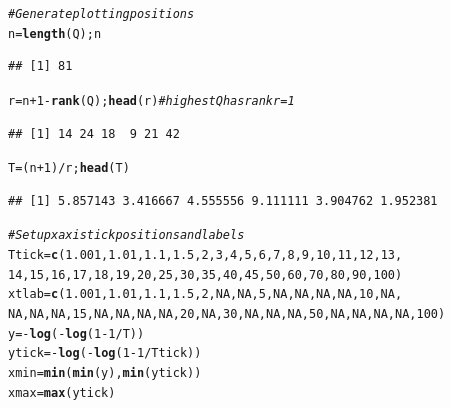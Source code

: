 \documentclass{tufte-handout}\usepackage[]{graphicx}\usepackage[]{xcolor}
\makeatletter
\newcommand{\hlnum}[1]{\textcolor[rgb]{0.686,0.059,0.569}{#1}}%
\newcommand{\hlcom}[1]{\textcolor[rgb]{0.678,0.584,0.686}{\textit{#1}}}%
\newcommand{\hlopt}[1]{\textcolor[rgb]{0,0,0}{#1}}%
\newcommand{\hlstd}[1]{\textcolor[rgb]{0.345,0.345,0.345}{#1}}%
\newcommand{\hlkwb}[1]{\textcolor[rgb]{0.69,0.353,0.396}{#1}}%
\newcommand{\hlkwd}[1]{\textcolor[rgb]{0.737,0.353,0.396}{\textbf{#1}}}%
\newenvironment{kframe}{%
 \def\at@end@of@kframe{}%
 \ifinner\ifhmode%
  \def\at@end@of@kframe{\end{minipage}}%
  \begin{minipage}{\columnwidth}%
 \fi\fi%
 \def\FrameCommand##1{\hskip\@totalleftmargin \hskip-\fboxsep
 \colorbox{shadecolor}{##1}\hskip-\fboxsep
     \hskip-\linewidth \hskip-\@totalleftmargin \hskip\columnwidth}%
 \MakeFramed {\advance\hsize-\width
   \@totalleftmargin\z@ \linewidth\hsize
   \@setminipage}}%
 {\par\unskip\endMakeFramed%
 \at@end@of@kframe}
\newenvironment{knitrout}{}{} %
\makeatother
\begin{document}
\begin{knitrout}
\begin{kframe}
\begin{alltt}
\hlcom{# Generate plotting positions}
\hlstd{n} \hlkwb{=} \hlkwd{length}\hlstd{(Q); n}
\end{alltt}
\begin{verbatim}
## [1] 81
\end{verbatim}
\begin{alltt}
\hlstd{r} \hlkwb{=} \hlstd{n} \hlopt{+} \hlnum{1} \hlopt{-} \hlkwd{rank}\hlstd{(Q);} \hlkwd{head}\hlstd{(r)}  \hlcom{# highest Q has rank r = 1}
\end{alltt}
\begin{verbatim}
## [1] 14 24 18  9 21 42
\end{verbatim}
\begin{alltt}
\hlstd{T} \hlkwb{=} \hlstd{(n} \hlopt{+} \hlnum{1}\hlstd{)}\hlopt{/}\hlstd{r;} \hlkwd{head}\hlstd{(T)}
\end{alltt}
\begin{verbatim}
## [1] 5.857143 3.416667 4.555556 9.111111 3.904762 1.952381
\end{verbatim}
\begin{alltt}
\hlcom{# Set up x axis tick positions and labels}
\hlstd{Ttick} \hlkwb{=} \hlkwd{c}\hlstd{(}\hlnum{1.001}\hlstd{,}\hlnum{1.01}\hlstd{,}\hlnum{1.1}\hlstd{,}\hlnum{1.5}\hlstd{,}\hlnum{2}\hlstd{,}\hlnum{3}\hlstd{,}\hlnum{4}\hlstd{,}\hlnum{5}\hlstd{,}\hlnum{6}\hlstd{,}\hlnum{7}\hlstd{,}\hlnum{8}\hlstd{,}\hlnum{9}\hlstd{,}\hlnum{10}\hlstd{,}\hlnum{11}\hlstd{,}\hlnum{12}\hlstd{,}\hlnum{13}\hlstd{,}
          \hlnum{14}\hlstd{,}\hlnum{15}\hlstd{,}\hlnum{16}\hlstd{,}\hlnum{17}\hlstd{,}\hlnum{18}\hlstd{,}\hlnum{19}\hlstd{,}\hlnum{20}\hlstd{,}\hlnum{25}\hlstd{,}\hlnum{30}\hlstd{,}\hlnum{35}\hlstd{,}\hlnum{40}\hlstd{,}\hlnum{45}\hlstd{,}\hlnum{50}\hlstd{,}\hlnum{60}\hlstd{,}\hlnum{70}\hlstd{,}\hlnum{80}\hlstd{,}\hlnum{90}\hlstd{,}\hlnum{100}\hlstd{)}
\hlstd{xtlab} \hlkwb{=} \hlkwd{c}\hlstd{(}\hlnum{1.001}\hlstd{,}\hlnum{1.01}\hlstd{,}\hlnum{1.1}\hlstd{,}\hlnum{1.5}\hlstd{,}\hlnum{2}\hlstd{,}\hlnum{NA}\hlstd{,}\hlnum{NA}\hlstd{,}\hlnum{5}\hlstd{,}\hlnum{NA}\hlstd{,}\hlnum{NA}\hlstd{,}\hlnum{NA}\hlstd{,}\hlnum{NA}\hlstd{,}\hlnum{10}\hlstd{,}\hlnum{NA}\hlstd{,}
          \hlnum{NA}\hlstd{,}\hlnum{NA}\hlstd{,}\hlnum{NA}\hlstd{,}\hlnum{15}\hlstd{,}\hlnum{NA}\hlstd{,}\hlnum{NA}\hlstd{,}\hlnum{NA}\hlstd{,}\hlnum{NA}\hlstd{,}\hlnum{20}\hlstd{,}\hlnum{NA}\hlstd{,}\hlnum{30}\hlstd{,}\hlnum{NA}\hlstd{,}\hlnum{NA}\hlstd{,}\hlnum{NA}\hlstd{,}\hlnum{50}\hlstd{,}\hlnum{NA}\hlstd{,}\hlnum{NA}\hlstd{,}\hlnum{NA}\hlstd{,}\hlnum{NA}\hlstd{,}\hlnum{100}\hlstd{)}
\hlstd{y} \hlkwb{=} \hlopt{-}\hlkwd{log}\hlstd{(}\hlopt{-}\hlkwd{log}\hlstd{(}\hlnum{1} \hlopt{-} \hlnum{1}\hlopt{/}\hlstd{T))}
\hlstd{ytick} \hlkwb{=} \hlopt{-}\hlkwd{log}\hlstd{(}\hlopt{-}\hlkwd{log}\hlstd{(}\hlnum{1} \hlopt{-} \hlnum{1}\hlopt{/}\hlstd{Ttick))}
\hlstd{xmin} \hlkwb{=} \hlkwd{min}\hlstd{(}\hlkwd{min}\hlstd{(y),}\hlkwd{min}\hlstd{(ytick))}
\hlstd{xmax} \hlkwb{=} \hlkwd{max}\hlstd{(ytick)}


\end{alltt}
\end{kframe}
\end{knitrout}
\end{document}
